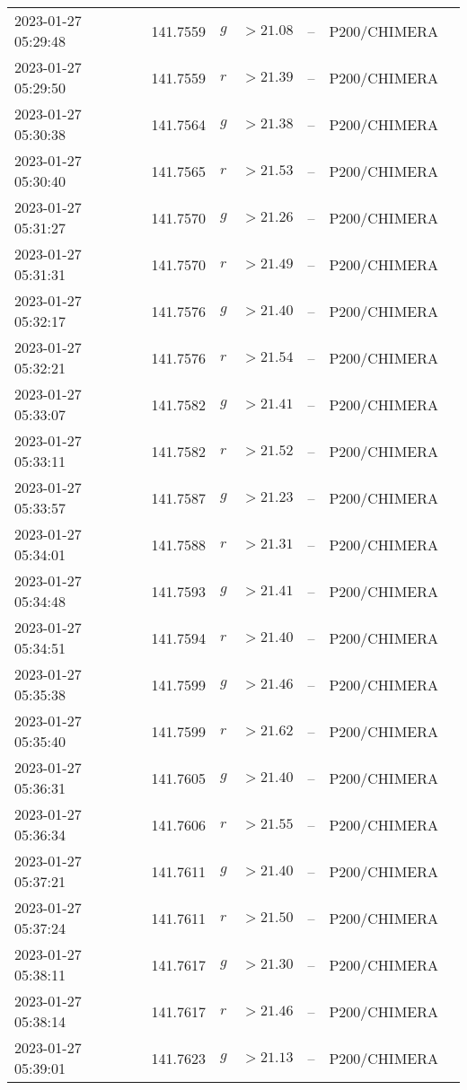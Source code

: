 \documentclass{nature_plusfigure}
\begin{document}
\begin{supplement}
\begin{center}
\begin{longtable}{lllllll}
2023-01-27 05:29:48 & 141.7559 & $g$ & $>21.08$ & -- & P200/CHIMERA &  \\ 
2023-01-27 05:29:50 & 141.7559 & $r$ & $>21.39$ & -- & P200/CHIMERA &  \\ 
2023-01-27 05:30:38 & 141.7564 & $g$ & $>21.38$ & -- & P200/CHIMERA &  \\ 
2023-01-27 05:30:40 & 141.7565 & $r$ & $>21.53$ & -- & P200/CHIMERA &  \\ 
2023-01-27 05:31:27 & 141.7570 & $g$ & $>21.26$ & -- & P200/CHIMERA &  \\ 
2023-01-27 05:31:31 & 141.7570 & $r$ & $>21.49$ & -- & P200/CHIMERA &  \\ 
2023-01-27 05:32:17 & 141.7576 & $g$ & $>21.40$ & -- & P200/CHIMERA &  \\ 
2023-01-27 05:32:21 & 141.7576 & $r$ & $>21.54$ & -- & P200/CHIMERA &  \\ 
2023-01-27 05:33:07 & 141.7582 & $g$ & $>21.41$ & -- & P200/CHIMERA &  \\ 
2023-01-27 05:33:11 & 141.7582 & $r$ & $>21.52$ & -- & P200/CHIMERA &  \\ 
2023-01-27 05:33:57 & 141.7587 & $g$ & $>21.23$ & -- & P200/CHIMERA &  \\ 
2023-01-27 05:34:01 & 141.7588 & $r$ & $>21.31$ & -- & P200/CHIMERA &  \\ 
2023-01-27 05:34:48 & 141.7593 & $g$ & $>21.41$ & -- & P200/CHIMERA &  \\ 
2023-01-27 05:34:51 & 141.7594 & $r$ & $>21.40$ & -- & P200/CHIMERA &  \\ 
2023-01-27 05:35:38 & 141.7599 & $g$ & $>21.46$ & -- & P200/CHIMERA &  \\ 
2023-01-27 05:35:40 & 141.7599 & $r$ & $>21.62$ & -- & P200/CHIMERA &  \\ 
2023-01-27 05:36:31 & 141.7605 & $g$ & $>21.40$ & -- & P200/CHIMERA &  \\ 
2023-01-27 05:36:34 & 141.7606 & $r$ & $>21.55$ & -- & P200/CHIMERA &  \\ 
2023-01-27 05:37:21 & 141.7611 & $g$ & $>21.40$ & -- & P200/CHIMERA &  \\ 
2023-01-27 05:37:24 & 141.7611 & $r$ & $>21.50$ & -- & P200/CHIMERA &  \\ 
2023-01-27 05:38:11 & 141.7617 & $g$ & $>21.30$ & -- & P200/CHIMERA &  \\ 
2023-01-27 05:38:14 & 141.7617 & $r$ & $>21.46$ & -- & P200/CHIMERA &  \\ 
2023-01-27 05:39:01 & 141.7623 & $g$ & $>21.13$ & -- & P200/CHIMERA &  \\ 

\end{longtable}
\end{center}
\end{supplement}
\end{document}
